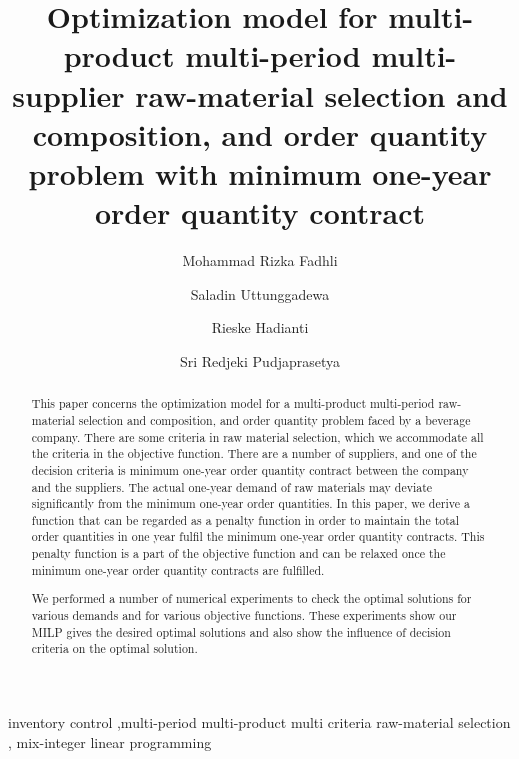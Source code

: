 \documentclass[preprint, 3p,
authoryear]{elsarticle} %
\begin{document}
\begin{frontmatter}

  \title{Optimization model for multi-product multi-period
multi-supplier raw-material selection and composition, and order
quantity problem with minimum one-year order quantity contract}
    \author[lala]{Mohammad Rizka Fadhli%
  }
    \author[lili]{Saladin Uttunggadewa%
  }
  
    \author[lulu]{Rieske Hadianti%
  }
  
    \author[lili]{Sri Redjeki Pudjaprasetya%
  }
  
  
  \begin{abstract}
  This paper concerns the optimization model for a multi-product
  multi-period raw-material selection and composition, and order
  quantity problem faced by a beverage company. There are some criteria
  in raw material selection, which we accommodate all the criteria in
  the objective function. There are a number of suppliers, and one of
  the decision criteria is minimum one-year order quantity contract
  between the company and the suppliers. The actual one-year demand of
  raw materials may deviate significantly from the minimum one-year
  order quantities. In this paper, we derive a function that can be
  regarded as a penalty function in order to maintain the total order
  quantities in one year fulfil the minimum one-year order quantity
  contracts. This penalty function is a part of the objective function
  and can be relaxed once the minimum one-year order quantity contracts
  are fulfilled.

  We performed a number of numerical experiments to check the optimal
  solutions for various demands and for various objective functions.
  These experiments show our MILP gives the desired optimal solutions
  and also show the influence of decision criteria on the optimal
  solution.
  \end{abstract}
    \begin{keyword}
    inventory control \sep multi-period multi-product multi criteria
raw-material selection \sep 
    mix-integer linear programming
  \end{keyword}
  
 \end{frontmatter}
\end{document}
